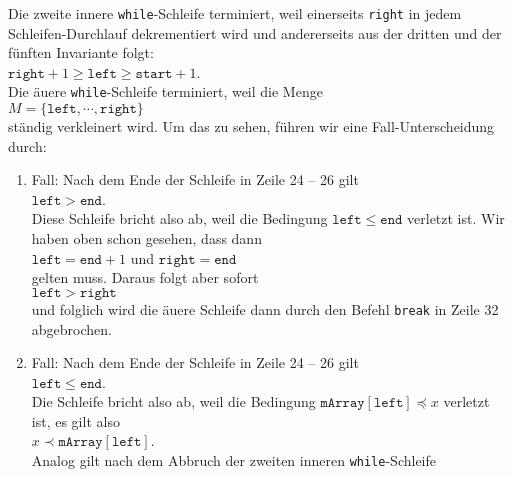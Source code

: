 Die zweite innere
\texttt{while}-Schleife terminiert, weil einerseits \texttt{right} in jedem Schleifen-Durchlauf
dekrementiert wird und andererseits aus der dritten und der f\"unften Invariante folgt: \\[0.2cm]
\hspace*{1.3cm} $\texttt{right} + 1\geq \texttt{left} \geq \mathtt{start} + 1$. \\[0.2cm]
Die \"au\3ere \texttt{while}-Schleife terminiert, weil die Menge \\[0.2cm]
\hspace*{1.3cm} $M = \{ \mathtt{left}, \cdots, \mathtt{right} \}$ \\[0.2cm]
st\"andig verkleinert wird.  Um das zu sehen, f\"uhren wir eine Fall-Unterscheidung durch:
\begin{enumerate}
\item Fall: Nach dem Ende der Schleife in Zeile 24 -- 26 gilt \\[0.2cm]
      \hspace*{1.3cm} $\mathtt{left} > \mathtt{end}$. \\[0.2cm]
      Diese Schleife bricht also ab, weil die Bedingung $\mathtt{left} \leq \mathtt{end}$
      verletzt ist.  Wir haben oben schon gesehen, dass dann \\[0.2cm]
      \hspace*{1.3cm} 
      $\texttt{left} = \mathtt{end} + 1$ \quad und \quad $\mathtt{right} = \mathtt{end}$
      \\[0.2cm]
      gelten muss.  Daraus folgt aber sofort \\[0.2cm]
      \hspace*{1.3cm} $\mathtt{left} > \mathtt{right}$ \\[0.2cm]
      und folglich wird die \"au\3ere Schleife dann durch den Befehl \texttt{break} in Zeile 32 abgebrochen.
\item Fall: Nach dem Ende der Schleife in Zeile 24 -- 26 gilt \\[0.2cm]
      \hspace*{1.3cm} $\mathtt{left} \leq \mathtt{end}$. \\[0.2cm]
      Die Schleife bricht also ab, weil die Bedingung 
      $\mathtt{mArray}[\mathtt{left}] \preceq x$ verletzt ist, es gilt also \\[0.2cm]
      \hspace*{1.3cm} $x \prec \mathtt{mArray}[\mathtt{left}]$. \\[0.2cm]
      Analog gilt nach dem Abbruch der zweiten inneren \texttt{while}-Schleife \\[0.2cm]

\end{enumerate}
